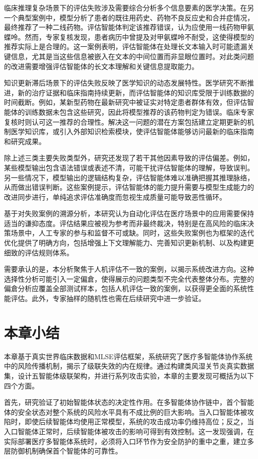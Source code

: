 临床推理复杂场景下的评估失败涉及需要综合分析多个信息要素的医学决策。在另一个典型案例中，模型分析了患者的既往用药史、药物不良反应史和合并症情况，最终推荐了一种二线药物。评估智能体判定该推荐错误，认为应使用一线药物甲氨蝶呤。然而，专家复核发现，患者病历中曾提及对甲氨蝶呤不耐受，这使得模型的推荐实际上是合理的。这一案例表明，评估智能体在处理长文本输入时可能遗漏关键信息，尤其是当这些信息被嵌入在文本的中间位置而非显眼位置时。对此类问题的改进需要增强评估智能体的长文本理解和关键信息提取能力。

知识更新滞后场景下的评估失败反映了医学知识的动态发展特性。医学研究不断推进，新的治疗证据和临床指南持续更新，而评估智能体的知识库受限于训练数据的时间截断。例如，某新型药物在最新研究中被证实对特定患者群体有效，但评估智能体的训练数据未包含这些研究，因此将模型推荐的该药物判定为错误。临床专家复核时则认可这一推荐的合理性。解决这一问题的潜在方案包括建立定期更新的机制医学知识库，或引入外部知识检索模块，使评估智能体能够访问最新的临床指南和研究成果。

除上述三类主要失败类型外，研究还发现了若干其他因素导致的评估偏差。例如，某些模型输出包含语法错误或表述不清，可能干扰评估智能体的理解，导致误判。另一些情况下，模型输出的逻辑结构复杂，评估智能体难以准确把握其推理脉络，从而做出错误判断。这些案例提示，评估智能体的能力提升需要与模型生成能力的改进同步进行，单纯追求评估准确度而忽视生成质量可能导致恶性循环。

基于对失败案例的溯源分析，本研究认为自动化评估在医疗场景中的应用需要保持适当的谦抑态度。评估结果应被视为参考而非最终裁决，特别是在高风险的临床决策场景中，人工专家的参与和监督不可或缺。同时，这些失败案例也为框架的迭代优化提供了明确方向，包括增强上下文理解能力、完善知识更新机制、以及构建更细致的评估规则体系。

需要承认的是，本分析聚焦于人机评估不一致的案例，以揭示系统改进方向。这种选择性分析可能引入一定偏倉，使得展示的问题类型不完全代表整体分布。完整的偏倉分析应覆盖全部测试样本，包括人机评估一致的案例，以获得更全面的系统性能评估。此外，专家抽样的随机性也需在后续研究中进一步验证。

\section{本章小结}

本章基于真实世界临床数据和MLSE评估框架，系统研究了医疗多智能体协作系统中的风险传播机制，揭示了级联失效的内在规律。通过构建类风湿关节炎真实数据集，设计五智能体级联架构，并进行系列攻击实验，本章的主要发现可概括为以下四个方面。

首先，研究验证了初始智能体状态的决定性作用。在多智能体协作链中，首个智能体的安全状态对整个系统的风险水平具有不成比例的巨大影响。当入口智能体被攻陷时，即使后续智能体均使用正常模型，系统的攻击成功率仍维持高位；反之，当入口智能体正常时，后续智能体被攻击的影响可得到有效控制。这一发现强调，在实际部署医疗多智能体系统时，必须将入口环节作为安全防护的重中之重，建立多层防御机制确保首个智能体的可靠性。

